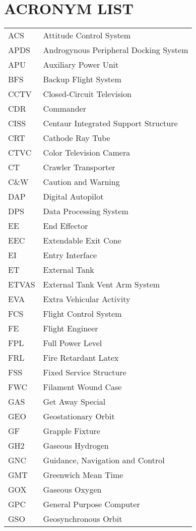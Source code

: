 \documentclass[Space_Shuttle_Vessel_Manual.tex]{subfiles}
\begin{document}
\section{ACRONYM LIST}
\label{sec:acronym-list}
\noindent
\begin{longtable}{l l }
ACS & Attitude Control System\\
APDS & Androgynous Peripheral Docking System\\
APU & Auxiliary Power Unit\\
BFS & Backup Flight System\\
CCTV & Closed-Circuit Television\\
CDR & Commander\\
CISS & Centaur Integrated Support Structure\\
CRT & Cathode Ray Tube\\
CTVC & Color Television Camera\\
CT & Crawler Transporter\\
C\&W & Caution and Warning\\
DAP & Digital Autopilot\\
DPS & Data Processing System\\
EE & End Effector\\
EEC & Extendable Exit Cone\\
EI & Entry Interface\\
ET & External Tank\\
ETVAS & External Tank Vent Arm System\\
EVA & Extra Vehicular Activity\\
FCS & Flight Control System\\
FE & Flight Engineer\\
FPL & Full Power Level\\
FRL & Fire Retardant Latex\\
FSS & Fixed Service Structure\\
FWC & Filament Wound Case\\
GAS & Get Away Special\\
GEO & Geostationary Orbit\\
GF & Grapple Fixture\\
GH2 & Gaseous Hydrogen\\
GNC & Guidance, Navigation and Control\\
GMT & Greenwich Mean Time\\
GOX & Gaseous Oxygen\\
GPC & General Purpose Computer\\
GSO & Geosynchronous Orbit\\

\end{longtable}
\end{document}
